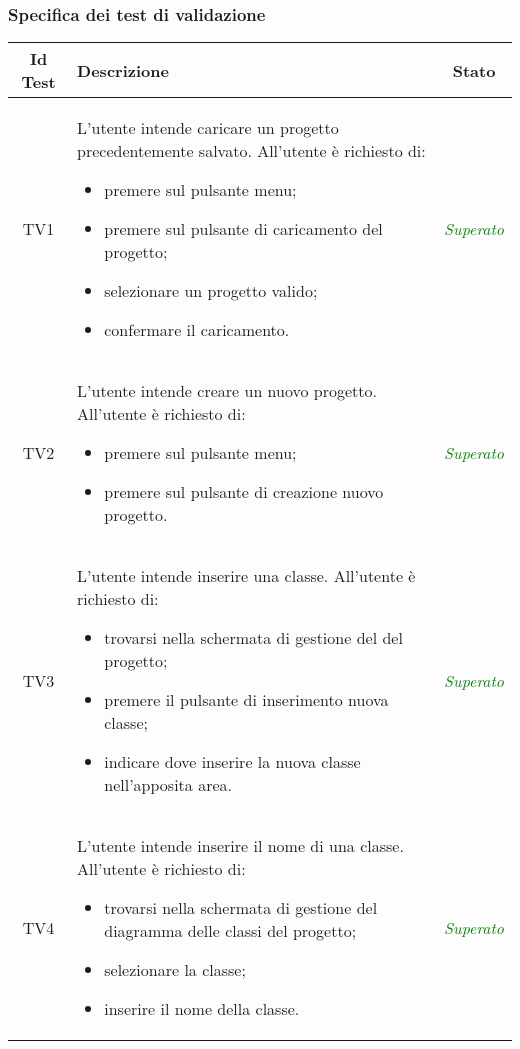 \subsubsection{Specifica dei test di validazione}
\normalsize
\begin{longtable}{|c|>{}m{8cm}|c|}
\hline 
\textbf{Id Test} & \textbf{Descrizione} & \textbf{Stato}\\
\hline
\endhead
\hypertarget{TV1}{TV1} & L'utente intende caricare un progetto precedentemente salvato. All'utente è richiesto di:
\begin{itemize}
	\item premere sul pulsante menu;
	\item premere sul pulsante di caricamento del progetto;
	\item selezionare un progetto valido;
	\item confermare il caricamento.
\end{itemize}
 & \textcolor{Green}{\textit{Superato}}\\ \hline
 
\hypertarget{TV2}{TV2} & L'utente intende creare un  nuovo progetto.
All'utente è richiesto di:
\begin{itemize}
	\item premere sul pulsante menu;
	\item premere sul pulsante di creazione nuovo progetto.
\end{itemize} & \textcolor{Green}{\textit{Superato}}\\ \hline

\hypertarget{TV3}{TV3} & L'utente intende inserire una classe.
All'utente è richiesto di:
\begin{itemize}
	\item trovarsi nella schermata di gestione del \gloss{diagramma delle classi} del progetto;
	\item premere il pulsante di inserimento nuova classe;
	\item indicare dove inserire la nuova classe nell'apposita area.
\end{itemize} & \textcolor{Green}{\textit{Superato}}\\ \hline

\hypertarget{TV4}{TV4} & L'utente intende inserire il nome di una classe.
All'utente è richiesto di:
\begin{itemize}
	\item trovarsi nella schermata di gestione del diagramma delle classi del progetto;
	\item selezionare la classe;
	\item inserire il nome della classe.
\end{itemize} & \textcolor{Green}{\textit{Superato}}\\ \hline


\end{longtable}
